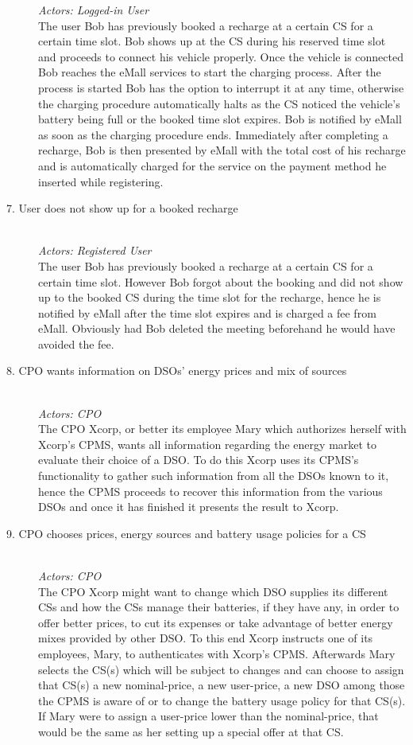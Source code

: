\documentclass[11pt]{article}
\begin{document}
\begin{description}
        \textit{Actors: Logged-in User} \\
        The user Bob has previously booked a recharge at a certain CS for a certain time slot. Bob shows up at the CS during his reserved time slot and proceeds to connect his vehicle properly. Once the vehicle is connected Bob reaches the eMall services to start the charging process. After the process is started Bob has the option to interrupt it at any time, otherwise the charging procedure automatically halts as the CS noticed the vehicle’s battery being full or the booked time slot expires. Bob is notified by eMall as soon as the charging procedure ends. Immediately after completing a recharge, Bob is then presented by eMall with the total cost of his recharge and is automatically charged for the service on the payment method he inserted while registering.
    \item [7. User does not show up for a booked recharge] \hfill \\
        \textit{Actors: Registered User} \\
        The user Bob has previously booked a recharge at a certain CS for a certain time slot. However Bob forgot about the booking and did not show up to the booked CS during the time slot for the recharge, hence he is notified by eMall after the time slot expires and is charged a fee from eMall. Obviously had Bob deleted the meeting beforehand he would have avoided the fee.
    \item [8. CPO wants information on DSOs’ energy prices and mix of sources] \hfill \\
        \textit{Actors: CPO} \\
        The CPO Xcorp, or better its employee Mary which authorizes herself with Xcorp's CPMS, wants all information regarding the energy market to evaluate their choice of a DSO. To do this Xcorp uses its CPMS’s functionality to gather such information from all the DSOs known to it, hence the CPMS proceeds to recover this information from the various DSOs and once it has finished it presents the result to Xcorp.
    \item [9. CPO chooses prices, energy sources and battery usage policies for a CS] \hfill \\
        \textit{Actors: CPO} \\
        The CPO Xcorp might want to change which DSO supplies its different CSs and how the CSs manage their batteries, if they have any, in order to offer better prices, to cut its expenses or take advantage of better energy mixes provided by other DSO. To this end Xcorp instructs one of its employees, Mary, to authenticates with Xcorp's CPMS. Afterwards Mary selects the CS(s) which will be subject to changes and can choose to assign that CS(s) a new nominal-price, a new user-price, a new DSO among those the CPMS is aware of or to change the battery usage policy for that CS(s). If Mary were to assign a user-price lower than the nominal-price, that would be the same as her setting up a special offer at that CS.
    

\end{description}
\end{document}
